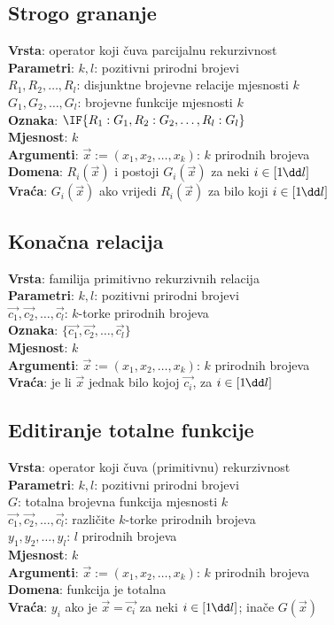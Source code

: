 \subsection{Strogo grananje}
\textbf{Vrsta}: operator koji čuva parcijalnu rekurzivnost\\
\textbf{Parametri}: $k,l$: pozitivni prirodni brojevi\\
$R_1,R_2,\dots,R_l$: disjunktne brojevne relacije mjesnosti $k$\\
$G_1,G_2,\dots,G_l$: brojevne funkcije mjesnosti $k$\\
\textbf{Oznaka}: $\IF{R_1:G_1,R_2:G_2,\dots,R_l:G_l}$\\
\textbf{Mjesnost}: $k$\\
\textbf{Argumenti}: $\vec x:=(x_1,x_2,\dots,x_k)$: $k$ prirodnih brojeva\\
\textbf{Domena}: $R_i(\vec x)$ i postoji $G_i(\vec x)$ za neki $i\in[1\mspace{-1mu}\dd l]$\\
\textbf{Vraća}: $G_i(\vec x)$ ako vrijedi $R_i(\vec x)$ za bilo koji $i\in[1\mspace{-1mu}\dd l]$

\subsection{Konačna relacija}
\textbf{Vrsta}: familija primitivno rekurzivnih relacija\\
\textbf{Parametri}: $k,l$: pozitivni prirodni brojevi\\
$\vec{c_1},\vec{c_2},\dots,\vec{c_l}$: $k$-torke prirodnih brojeva\\
\textbf{Oznaka}: $\{\vec{c_1},\vec{c_2},\dots,\vec{c_l}\}$\\
\textbf{Mjesnost}: $k$\\
\textbf{Argumenti}: $\vec x:=(x_1,x_2,\dots,x_k)$: $k$ prirodnih brojeva\\
\textbf{Vraća}: je li $\vec x$ jednak bilo kojoj $\vec{c_i}$, za $i\in[1\mspace{-1mu}\dd l]$

\subsection{Editiranje totalne funkcije}
\textbf{Vrsta}: operator koji čuva (primitivnu) rekurzivnost\\
\textbf{Parametri}: $k,l$: pozitivni prirodni brojevi\\
$G$: totalna brojevna funkcija mjesnosti $k$\\
$\vec{c_1},\vec{c_2},\dots,\vec{c_l}$: različite $k$-torke prirodnih brojeva\\
$y_1,y_2,\dots,y_l$: $l$ prirodnih brojeva\\
\textbf{Mjesnost}: $k$\\
\textbf{Argumenti}: $\vec x:=(x_1,x_2,\dots,x_k)$: $k$ prirodnih brojeva\\
\textbf{Domena}: funkcija je totalna\\
\textbf{Vraća}: $y_i$ ako je $\vec x=\vec{c_i}$ za neki $i\in[1\mspace{-1mu}\dd l]$; inače $G(\vec x)$

